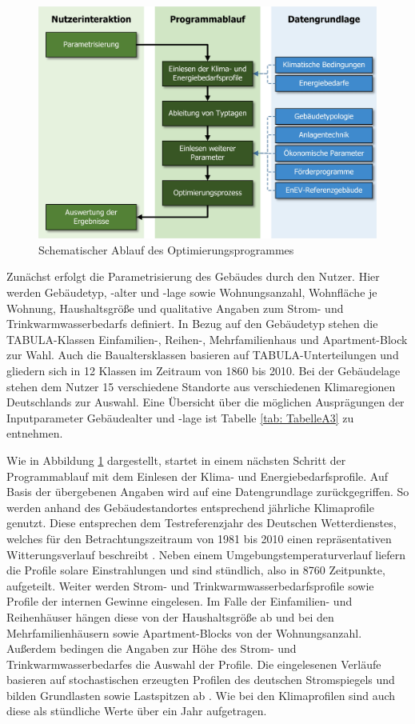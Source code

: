 \begin{figure}[H]
	\centering
		\includegraphics{Pictures/ProzessOptiProgramm.jpg}
	\caption{Schematischer Ablauf des Optimierungsprogrammes}
	\label{fig: Abbildung321} 
\end{figure}

Zunächst erfolgt die Parametrisierung des Gebäudes durch den Nutzer.
Hier werden Gebäudetyp, -alter und -lage sowie Wohnungsanzahl, Wohnfläche je Wohnung, Haushaltsgröße und qualitative Angaben zum Strom- und Trinkwarmwasserbedarfs definiert.
In Bezug auf den Gebäudetyp stehen die TABULA-Klassen Einfamilien-, Reihen-, Mehrfamilienhaus und Apartment-Block zur Wahl.
Auch die Baualtersklassen basieren auf TABULA-Unterteilungen und gliedern sich in 12 Klassen im Zeitraum von 1860 bis 2010.
Bei der Gebäudelage stehen dem Nutzer 15 verschiedene Standorte aus verschiedenen Klimaregionen Deutschlands zur Auswahl.
Eine Übersicht über die möglichen Ausprägungen der Inputparameter Gebäudealter und -lage ist Tabelle \ref{tab: TabelleA3} zu entnehmen. \cite{Loga.102012}

Wie in Abbildung \ref{fig: Abbildung321} dargestellt, startet in einem nächsten Schritt der Programmablauf mit dem Einlesen der Klima- und Energiebedarfsprofile.
Auf Basis der übergebenen Angaben wird auf eine Datengrundlage zurückgegriffen.
So werden anhand des Gebäudestandortes entsprechend jährliche Klimaprofile genutzt.
Diese entsprechen dem Testreferenzjahr des Deutschen Wetterdienstes, welches für den Betrachtungszeitraum von 1981 bis 2010 einen repräsentativen Witterungsverlauf beschreibt \cite{try}.
Neben einem Umgebungstemperaturverlauf liefern die Profile solare Einstrahlungen und sind stündlich, also in 8760 Zeitpunkte, aufgeteilt.
Weiter werden Strom- und Trinkwarmwasserbedarfsprofile sowie Profile der internen Gewinne eingelesen.
Im Falle der Einfamilien- und Reihenhäuser hängen diese von der Haushaltsgröße ab und bei den Mehrfamilienhäusern sowie Apartment-Blocks von der Wohnungsanzahl.
Außerdem bedingen die Angaben zur Höhe des Strom- und Trinkwarmwasserbedarfes die Auswahl der Profile.
Die eingelesenen Verläufe basieren auf stochastischen erzeugten Profilen des deutschen Stromspiegels und bilden Grundlasten sowie Lastspitzen ab \cite{stromspiegel}.
Wie bei den Klimaprofilen sind auch diese als stündliche Werte über ein Jahr aufgetragen.


